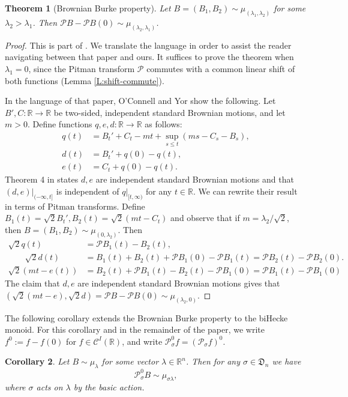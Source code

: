 \documentclass[11pt]{article}
\newcommand{\R}{\mathbb{R}}
\newcommand{\sig}{\sigma}
\newcommand{\la}{\lambda}
\newcommand{\cC}{\mathcal{C}}
\newcommand{\cP}{\mathcal{P}}
\newtheorem{theorem}{Theorem}[section]
\newtheorem{corollary}[theorem]{Corollary}
\theoremstyle{definition} %
\theoremstyle{remark} %
\begin{document}
\begin{theorem}[Brownian Burke property]
	\label{T:Brownian-Burke}
	Let $B = (B_1, B_2) \sim \mu_{(\la_1, \la_2)}$ for some $\la_2 > \la_1$. Then
$\cP B - \cP B(0) \sim \mu_{(\la_2, \la_1)}$.
\end{theorem}

\begin{proof}
	This is part of \cite[Theorem 4]{o2001brownian}. We translate the language in order to assist the reader navigating between that paper and ours. It suffices to prove the theorem when $\la_1 = 0$, since the Pitman transform $\cP$ commutes with a common linear shift of both functions (Lemma \ref{L:shift-commute}).
	
	In the language of that paper, O'Connell and Yor show the following. Let $B', C:\R \to \R$ be two-sided, independent standard Brownian motions, and let $m > 0$. Define functions $q, e, d:\R \to \R$ as follows:
	\begin{align*}
		q(t) &= B_t' + C_t - mt + \sup_{s \le t} (ms - C_s - B_s), \\
		d(t) &= B_t' + q(0) - q(t),\\
		e(t)&= C_t + q(0) - q(t).
	\end{align*}
	Theorem 4 in \cite{o2001brownian} states $d, e$ are independent standard Brownian motions and that $(d, e)|_{(-\infty, t]}$ is independent of $q|_{[t, \infty)}$ for any $t \in \R$. We can rewrite their result in terms of Pitman transforms. Define $B_1(t) = \sqrt{2} B_t', B_2(t) = \sqrt{2}(mt - C_t)$ and observe that if $m = \la_2/\sqrt{2}$, then $B = (B_1, B_2) \sim \mu_{(0, \la_2)}$. Then
	\begin{align*}
		\sqrt{2} q(t) &= \cP B_1(t) - B_2(t), \\ \qquad \sqrt{2} d(t) &= B_1(t) + B_2(t) + \cP B_1(0) - \cP B_1(t) = \cP B_2(t) - \cP B_2(0).\\
		\sqrt{2} (mt - e(t)) &= B_2(t) + \cP B_1(t) - B_2(t) - \cP B_1(0) = \cP B_1(t) - \cP B_1(0)
	\end{align*}
	The claim that $d, e$ are independent standard Brownian motions gives that $(\sqrt{2}(mt - e), \sqrt{2}d) = \cP B - \cP B(0) \sim \mu_{(\la_2, 0)}$. 
\end{proof}

The following corollary extends the Brownian Burke property to the biHecke monoid. For this corollary and in the remainder of the paper, we write $f^0 := f - f(0)$ for $f \in \cC^I(\R)$, and write $\cP^0_\sig f = (\cP_\sig f)^0$.
\begin{corollary}
	\label{C:Brownian-sorting}
	Let $B \sim \mu_{\la}$ for some vector $\la \in \R^n$. Then for any $\sigma \in \mathfrak{D}_n$ we have
	\begin{equation}
		\label{E:extended-Burke}
		\cP_\sig^0 B \sim \mu_{\sig \la},
	\end{equation}
	where $\sig$ acts on $\la$ by the basic action.
\end{corollary}
\end{document}
